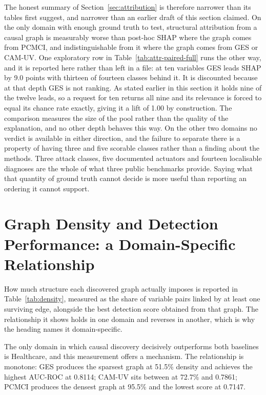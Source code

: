 The honest summary of Section~\ref{sec:attribution} is therefore narrower than its tables first suggest, and narrower than an earlier draft of this section claimed. On the only domain with enough ground truth to test, structural attribution from a causal graph is measurably worse than post-hoc SHAP where the graph comes from PCMCI, and indistinguishable from it where the graph comes from GES or CAM-UV. One exploratory row in Table~\ref{tab:attr-paired-full} runs the other way, and it is reported
here rather than left in a file: at ten variables GES leads SHAP by 9.0 points with thirteen of fourteen classes behind it. It is discounted because at that depth GES is not ranking. As stated earlier in this section it holds nine of the twelve leads, so a request for ten returns all nine and its relevance is forced to equal its chance rate exactly, giving it a lift of 1.00 by construction. The comparison measures the size of the pool rather than the quality of the explanation, and no
other depth behaves this way. On the other two domains no verdict is available in either direction, and the failure to separate there is a property of having three and five scorable classes rather than a finding about the methods. Three attack classes, five documented actuators and fourteen localisable diagnoses are the whole of what three public benchmarks provide. Saying what that quantity of ground truth cannot decide is more useful than reporting an ordering it cannot support.

\section{Graph Density and Detection Performance: a Domain-Specific Relationship}
\label{sec:density}

How much structure each discovered graph actually imposes is reported in Table~\ref{tab:density}, measured as the share of variable pairs linked by at least one surviving edge, alongside the best detection score obtained from that graph. The relationship it shows holds in one domain and reverses in another, which is why the heading names it domain-specific.

The only domain in which causal discovery decisively outperforms both baselines is Healthcare, and this measurement offers a mechanism. The relationship is monotone: GES produces the sparsest graph at 51.5\% density and achieves the highest AUC-ROC at 0.8114; CAM-UV sits between at 72.7\% and 0.7861; PCMCI produces the densest graph at 95.5\% and the lowest score at 0.7147.

